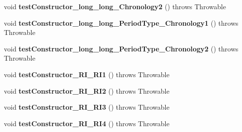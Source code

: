 \begin{DoxyCompactItemize}
\item 
\hypertarget{classorg_1_1joda_1_1time_1_1_test_mutable_period___constructors_a939180aad3beada163392b25ed954d9c}{void {\bfseries test\-Constructor\-\_\-long\-\_\-long\-\_\-\-Chronology2} ()  throws Throwable }\label{classorg_1_1joda_1_1time_1_1_test_mutable_period___constructors_a939180aad3beada163392b25ed954d9c}

\item 
\hypertarget{classorg_1_1joda_1_1time_1_1_test_mutable_period___constructors_af78e419c9b52ee07b72ede69716d2ba7}{void {\bfseries test\-Constructor\-\_\-long\-\_\-long\-\_\-\-Period\-Type\-\_\-\-Chronology1} ()  throws Throwable }\label{classorg_1_1joda_1_1time_1_1_test_mutable_period___constructors_af78e419c9b52ee07b72ede69716d2ba7}

\item 
\hypertarget{classorg_1_1joda_1_1time_1_1_test_mutable_period___constructors_af632d212aa0282273568ebd7747db52b}{void {\bfseries test\-Constructor\-\_\-long\-\_\-long\-\_\-\-Period\-Type\-\_\-\-Chronology2} ()  throws Throwable }\label{classorg_1_1joda_1_1time_1_1_test_mutable_period___constructors_af632d212aa0282273568ebd7747db52b}

\item 
\hypertarget{classorg_1_1joda_1_1time_1_1_test_mutable_period___constructors_af1ac07f9423b5af7ef43929d6106eb36}{void {\bfseries test\-Constructor\-\_\-\-R\-I\-\_\-\-R\-I1} ()  throws Throwable }\label{classorg_1_1joda_1_1time_1_1_test_mutable_period___constructors_af1ac07f9423b5af7ef43929d6106eb36}

\item 
\hypertarget{classorg_1_1joda_1_1time_1_1_test_mutable_period___constructors_a90220fa68dc84649e355a8fce6d18429}{void {\bfseries test\-Constructor\-\_\-\-R\-I\-\_\-\-R\-I2} ()  throws Throwable }\label{classorg_1_1joda_1_1time_1_1_test_mutable_period___constructors_a90220fa68dc84649e355a8fce6d18429}

\item 
\hypertarget{classorg_1_1joda_1_1time_1_1_test_mutable_period___constructors_a414a09b4aeb674f5eeec7a07668e9dfe}{void {\bfseries test\-Constructor\-\_\-\-R\-I\-\_\-\-R\-I3} ()  throws Throwable }\label{classorg_1_1joda_1_1time_1_1_test_mutable_period___constructors_a414a09b4aeb674f5eeec7a07668e9dfe}

\item 
\hypertarget{classorg_1_1joda_1_1time_1_1_test_mutable_period___constructors_a96ff8994887360ad030b7fb352884b5c}{void {\bfseries test\-Constructor\-\_\-\-R\-I\-\_\-\-R\-I4} ()  throws Throwable }\label{classorg_1_1joda_1_1time_1_1_test_mutable_period___constructors_a96ff8994887360ad030b7fb352884b5c}


\end{DoxyCompactItemize}
